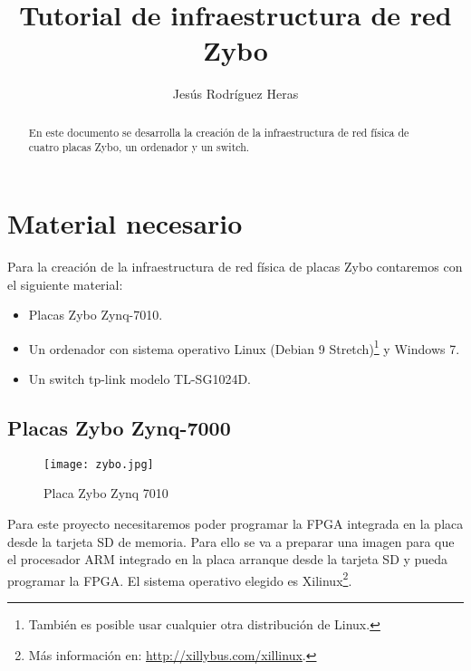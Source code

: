 \documentclass[12pt,letterpaper]{article}
\title{Tutorial de infraestructura de red Zybo}
\author{Jesús Rodríguez Heras}
\begin{document}
	
	\maketitle
	\begin{abstract} %
		\begin{center}
			En este documento se desarrolla la creación de la infraestructura de red física de cuatro placas Zybo, un ordenador y un switch.
		\end{center}
	\end{abstract}
	\thispagestyle{empty}
	\newpage
	
	\tableofcontents
	\newpage
	
	
	
	
	\lstset{language=bash, numbers=left, numberstyle=\tiny, numbersep=10pt, firstnumber=1, stepnumber=1, basicstyle=\small\ttfamily, tabsize=1, extendedchars=true, inputencoding=latin1}


\section{Material necesario}
Para la creación de la infraestructura de red física de placas Zybo contaremos con el siguiente material:
\begin{itemize}
	\item Placas Zybo Zynq-7010.
	\item Un ordenador con sistema operativo Linux (Debian 9 Stretch)\footnote{También es posible usar cualquier otra distribución de Linux.} y Windows 7.
	\item Un switch tp-link modelo TL-SG1024D.
\end{itemize}


\subsection{Placas Zybo Zynq-7000}
\begin{figure}[h]
	\centering
	\texttt{[image: zybo.jpg]}
	\caption{Placa Zybo Zynq 7010}
	\label{Placa Zybo}
\end{figure}
Para este proyecto necesitaremos poder programar la FPGA integrada en la placa desde la tarjeta SD de memoria. Para ello se va a preparar una imagen para que el procesador ARM integrado en la placa arranque desde la tarjeta SD y pueda programar la FPGA. El sistema operativo elegido es Xilinux\footnote{Más información en: \url{http://xillybus.com/xillinux}.}.
\end{document}
